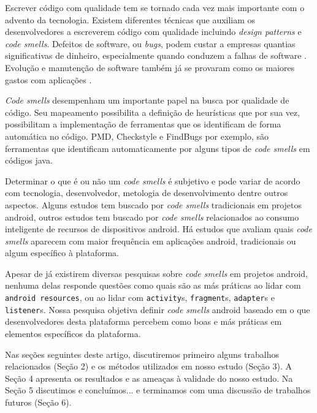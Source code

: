 Escrever c\'odigo com qualidade tem se tornado cada vez mais importante com o advento da tecnologia. Existem diferentes t\'ecnicas que auxiliam os desenvolvedores a escreverem c\'odigo com qualidade incluindo \textit{design patterns} e \textit{code smells}. Defeitos de software, ou \textit{bugs}, podem custar a empresas quantias significativas de dinheiro, especialmente quando conduzem a falhas de software \cite{Nagappan:2005, briand1993modeling}. Evolu\c{c}\~ao e manuten\c{c}\~ao de software tamb\'em j\'a se provaram como os maiores gastos com aplica\c{c}\~oes \cite{RefactoringAndImprovements:10}.

\textit{Code smells} desempenham um importante papel na busca por qualidade de c\'odigo. Seu mapeamento possibilita a defini\c{c}\~ao de heur\'isticas que por sua vez, possibilitam a implementa\c{c}\~ao de ferramentas que os identificam de forma autom\'atica no c\'odigo. PMD, Checkstyle e FindBugs por exemplo, s\~ao ferramentas que identificam automaticamente por alguns tipos de \textit{code smells} em c\'odigos java.

Determinar o que \'e ou n\~ao um \textit{code smells} \'e subjetivo e pode variar de acordo com tecnologia, desenvolvedor, metologia de desenvolvimento dentre outros aspectos. Alguns estudos tem buscado por \textit{code smells} tradicionais em projetos android, outros estudos tem buscado por \textit{code smells} relacionados ao consumo inteligente de recursos de dispositivos android. H\'a estudos que avaliam quais \textit{code smells} aparecem com maior frequ\^encia em aplica\c{c}\~oes android, tradicionais ou algum espec\'ifico \`a plataforma.

Apesar de j\'a existirem diversas pesquisas sobre \textit{code smells} em projetos android, nenhuma delas responde quest\~oes como quais s\~ao as m\'as pr\'aticas ao lidar com \texttt{android resources}, ou ao lidar com \texttt{activity}s, \texttt{fragment}s, \texttt{adapter}s e \texttt{listener}s. Nossa pesquisa objetiva definir \textit{code smells} android baseado em o que desenvolvedores desta plataforma percebem como boas e m\'as pr\'aticas em elementos espec\'ificos da plataforma.

Nas se\c{c}\~oes seguintes deste artigo, discutiremos primeiro alguns trabalhos relacionados (Se\c{c}\~ao 2) e os m\'etodos utilizados em nosso estudo (Se\c{c}\~ao 3). A Se\c{c}\~ao 4 apresenta os resultados e as amea\c{c}as \`a validade do nosso estudo. Na Se\c{c}\~ao 5 discutimos e conclu\'imos... e terminamos com uma discuss\~ao de trabalhos futuros (Se\c{c}\~ao 6).
